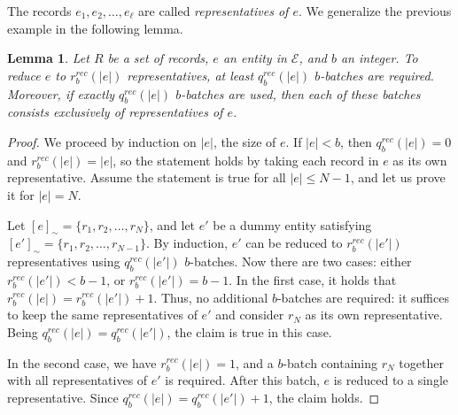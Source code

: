 \documentclass[sigconf, nonacm]{acmart}
\newtheorem{lemma}{Lemma}[section]
\begin{document}
The records $e_1, e_2,\ldots, e_\ell$ are called \emph{representatives of $e$}. We generalize the previous example in the following lemma.

\begin{lemma}\label{lemma:representatives}
    Let $R$ be a set of records, $e$ an entity in $\mathcal{E}$, and $b$ an integer. 
    To reduce $e$ to $r^{rec}_b(|e|)$ representatives, at least $q^{rec}_b(|e|)$ $b$-batches are required. 
    Moreover, if exactly $q^{rec}_b(|e|)$ $b$-batches are used, then each of these batches consists exclusively of representatives of $e$.
\end{lemma}
\begin{proof}
We proceed by induction on $|e|$, the size of $e$. If $|e|< b$, then $q^{rec}_b(|e|) = 0$ and $r^{rec}_b(|e|) = |e|$, so the statement holds by taking each record in $e$ as its own representative.
Assume the statement is true for all  $|e|\leq N-1$, and let us prove it for $|e| = N$.

Let $[e]_\sim=\{r_1, r_2,\ldots, r_N\}$, and let $e'$ be a dummy entity satisfying $[e']_\sim = \{r_1, r_2,\ldots, r_{N-1}\}$. By induction, $e'$ can be reduced to $r^{rec}_b(|e'|)$ representatives using $q^{rec}_b(|e'|)$ $b$-batches. Now there are two cases: either $r^{rec}_b(|e'|) < b-1$, or $r^{rec}_b(|e'|) = b-1$. In the first case, it holds that $r^{rec}_b(|e|) = r^{rec}_b(|e'|) +1$. Thus, no additional $b$-batches are required: it suffices to keep the same representatives of $e'$ and consider $r_N$ as its own representative. Being $q^{rec}_b(|e|) = q^{rec}_b(|e'|)$, the claim is true in this case.

In the second case, we have $r^{rec}_b(|e|) = 1$, and a $b$-batch containing $r_N$ together with all representatives of $e'$ is required. After this batch, $e$ is reduced to a single representative. Since $q^{rec}_b(|e|) = q^{rec}_b(|e'|) + 1$, the claim holds.
\end{proof}
\end{document}
